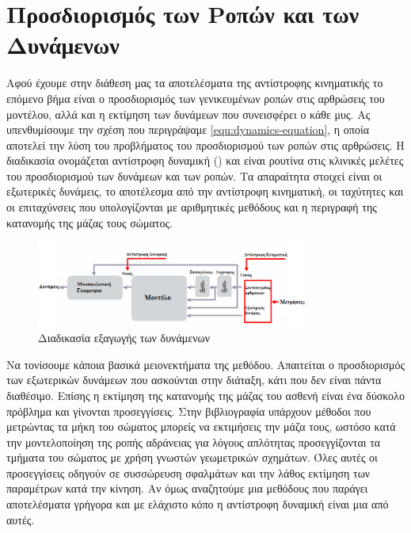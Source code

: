 \section{Προσδιορισμός των Ροπών και των Δυνάμενων}

Αφού έχουμε στην διάθεση μας τα αποτελέσματα της αντίστροφης κινηματικής το επόμενο βήμα είναι ο προσδιορισμός των γενικευμένων ροπών στις αρθρώσεις του μοντέλου, αλλά και η εκτίμηση των δυνάμεων που συνεισφέρει ο κάθε μυς. Ας υπενθυμίσουμε την σχέση που περιγράψαμε \ref{equ:dynamics-equation}, η οποία αποτελεί την λύση του προβλήματος του προσδιορισμού των ροπών στις αρθρώσεις. Η διαδικασία ονομάζεται αντίστροφη δυναμική () και είναι ρουτίνα στις κλινικές μελέτες του προσδιορισμού των δυνάμεων και των ροπών. Τα απαραίτητα στοιχεί είναι οι εξωτερικές δυνάμεις, το αποτέλεσμα από την αντίστροφη κινηματική, οι ταχύτητες και οι επιταχύνσεις που υπολογίζονται με αριθμητικές μεθόδους και η περιγραφή της κατανομής της μάζας τους σώματος.

\begin{figure}[H]
    \centering
    \includegraphics[width=0.8\textwidth, keepaspectratio]{fig/process.png}
    \caption{Διαδικασία εξαγωγής των δυνάμενων\protect\footnotemark}
    \label{fig:methods-process1}
\end{figure}

Να τονίσουμε κάποια βασικά μειονεκτήματα της μεθόδου. Απαιτείται ο προσδιορισμός των εξωτερικών δυνάμεων που ασκούνται στην διάταξη, κάτι που δεν είναι πάντα διαθέσιμο. Επίσης η εκτίμηση της κατανομής της μάζας του ασθενή είναι ένα δύσκολο πρόβλημα και γίνονται προσεγγίσεις. Στην βιβλιογραφία υπάρχουν μέθοδοι που μετρώντας τα μήκη του σώματος μπορείς να εκτιμήσεις την μάζα τους, ωστόσο κατά την μοντελοποίηση της ροπής αδράνειας για λόγους απλότητας προσεγγίζονται τα τμήματα του σώματος με χρήση γνωστών γεωμετρικών σχημάτων. Όλες αυτές οι προσεγγίσεις οδηγούν σε συσσώρευση σφαλμάτων και την λάθος εκτίμηση των παραμέτρων κατά την κίνηση. Αν όμως αναζητούμε μια μεθόδους που παράγει αποτελέσματα γρήγορα και με ελάχιστο κόπο η αντίστροφη δυναμική είναι μια από αυτές.

